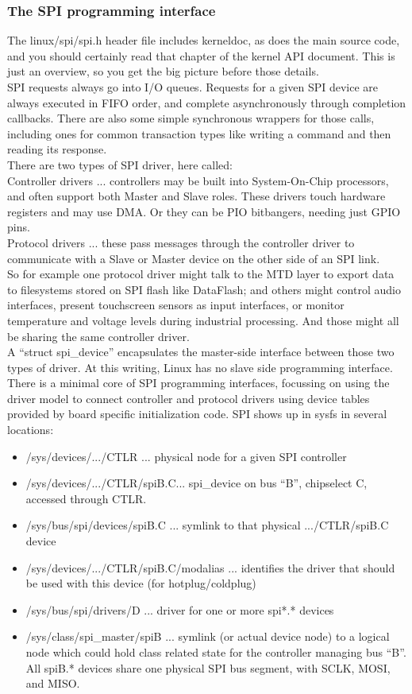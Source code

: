 \subsubsection{The SPI programming interface}
The linux/spi/spi.h header file includes kerneldoc, as does the main source code, and you should certainly read that chapter of the kernel API document.  This is just an overview, so you get the big picture before those details. \\
SPI requests always go into I/O queues.  Requests for a given SPI device are always executed in FIFO order, and complete asynchronously through completion callbacks.  There are also some simple synchronous wrappers for those calls, including ones for common transaction types like writing a command and then reading its response. \\
There are two types of SPI driver, here called: \\
Controller drivers ... controllers may be built into System-On-Chip 	processors, and often support both Master and Slave roles. 	These drivers touch hardware registers and may use DMA. 	Or they can be PIO bitbangers, needing just GPIO pins.\\ 
Protocol drivers ... these pass messages through the controller 	driver to communicate with a Slave or Master device on the 	other side of an SPI link. \\
So for example one protocol driver might talk to the MTD layer to export data to filesystems stored on SPI flash like DataFlash; and others might control audio interfaces, present touchscreen sensors as input interfaces, or monitor temperature and voltage levels during industrial processing. And those might all be sharing the same controller driver.\\
A ``struct spi\_device'' encapsulates the master-side interface between those two types of driver.  At this writing, Linux has no slave side programming interface. \\
There is a minimal core of SPI programming interfaces, focussing on using the driver model to connect controller and protocol drivers using device tables provided by board specific initialization code.  SPI shows up in sysfs in several locations: 
\begin{itemize}
	\item /sys/devices/.../CTLR ... physical node for a given SPI controller 
	\item /sys/devices/.../CTLR/spiB.C... spi\_device on bus ``B'', chipselect C, accessed through CTLR. 
	\item /sys/bus/spi/devices/spiB.C ... symlink to that physical .../CTLR/spiB.C device 
	\item /sys/devices/.../CTLR/spiB.C/modalias ... identifies the driver that should be used with this device (for hotplug/coldplug) 
	\item /sys/bus/spi/drivers/D ... driver for one or more spi*.* devices 
	\item /sys/class/spi\_master/spiB ... symlink (or actual device node) to a logical node which could hold class related state for the controller managing bus ``B''. All spiB.* devices share one physical SPI bus segment, with SCLK, MOSI, and MISO. 
\end{itemize}
